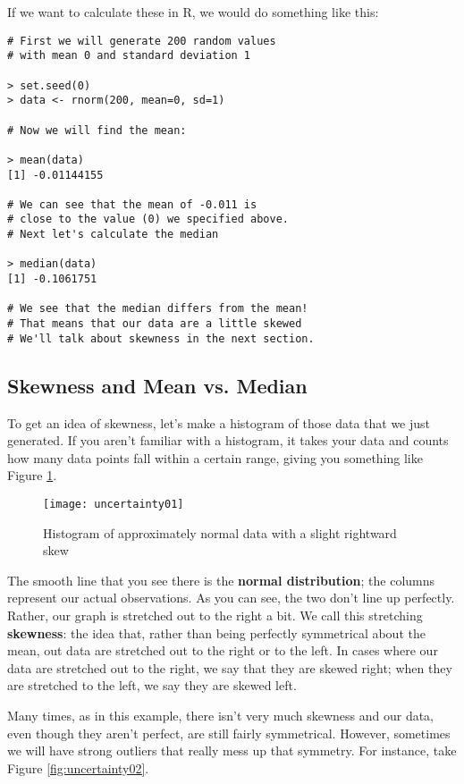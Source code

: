 If we want to calculate these in R, we would do something like this:
\begin{Verbatim}[samepage=TRUE]
# First we will generate 200 random values
# with mean 0 and standard deviation 1
 
> set.seed(0)
> data <- rnorm(200, mean=0, sd=1)
 
# Now we will find the mean:
 
> mean(data)
[1] -0.01144155
 
# We can see that the mean of -0.011 is
# close to the value (0) we specified above.
# Next let's calculate the median
 
> median(data)
[1] -0.1061751
 
# We see that the median differs from the mean!
# That means that our data are a little skewed
# We'll talk about skewness in the next section.
\end{Verbatim}

\subsection{Skewness and Mean vs. Median}
To get an idea of skewness, let's make a histogram of those data that we just generated. If you aren't familiar with a histogram, it takes your data and counts how many data points fall within a certain range, giving you something like Figure \ref{fig:uncertainty01}.

\begin{figure}[h!]
\texttt{[image: uncertainty01]}
\caption{Histogram of approximately normal data with a slight rightward skew}
\label{fig:uncertainty01}
\end{figure}

The smooth line that you see there is the \textbf{normal distribution}; the columns represent our actual observations. As you can see, the two don't line up perfectly. Rather, our graph is stretched out to the right a bit. We call this stretching \textbf{skewness}: the idea that, rather than being perfectly symmetrical about the mean, out data are stretched out to the right or to the left. In cases where our data are stretched out to the right, we say that they are skewed right; when they are stretched to the left, we say they are skewed left.

Many times, as in this example, there isn't very much skewness and our data, even though they aren't perfect, are still fairly symmetrical. However, sometimes we will have strong outliers that really mess up that symmetry. For instance, take Figure \ref{fig:uncertainty02}.

